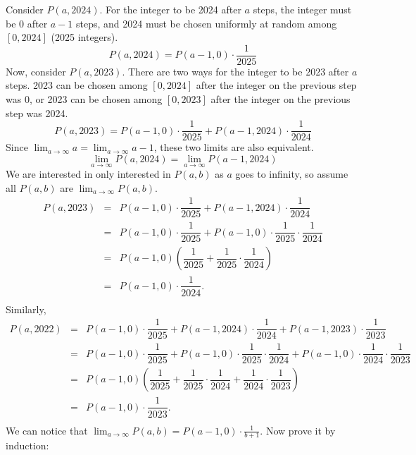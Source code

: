 \documentclass[12pt, oneside]{article}
\begin{document}
Consider $P(a, 2024)$. For the integer to be 2024 after $a$ steps, the integer must be 0 after $a-1$ steps, and 2024 must be chosen uniformly at random among $[0, 2024]$ (2025 integers).
\[P(a, 2024) = P(a-1, 0) \cdot \frac{1}{2025}\]
Now, consider $P(a, 2023)$. There are two ways for the integer to be 2023 after $a$ steps. 2023 can be chosen among $[0, 2024]$ after the integer on the previous step was 0, or 2023 can be chosen among $[0, 2023]$ after the integer on the previous step was 2024.
\[P(a, 2023) = P(a-1, 0) \cdot \frac{1}{2025} + P(a-1, 2024) \cdot \frac{1}{2024}\]
Since $\displaystyle \lim_{a \rightarrow \infty} a = \lim_{a \rightarrow \infty} a-1$, these two limits are also equivalent. \[ \lim_{a \rightarrow \infty} P(a, 2024) = \lim_{a \rightarrow \infty} P(a-1, 2024)\]
We are interested in only interested in $P(a, b)$ as $a$ goes to infinity, so assume all $P(a, b)$ are $\lim_{a \rightarrow \infty} P(a, b)$.
\begin{eqnarray*}
P(a, 2023) &=& P(a-1, 0) \cdot \dfrac{1}{2025} + P(a-1, 2024) \cdot \dfrac{1}{2024}\\
 &=& P(a-1, 0) \cdot \dfrac{1}{2025} + P(a-1, 0) \cdot \dfrac{1}{2025} \cdot \dfrac{1}{2024}\\
 &=& P(a-1, 0) (\dfrac{1}{2025} + \dfrac{1}{2025} \cdot \dfrac{1}{2024})\\
 &=& P(a-1, 0) \cdot \dfrac{1}{2024}.\\
 \end{eqnarray*}
 Similarly, 
\begin{eqnarray*}
P(a, 2022) &=& P(a-1, 0) \cdot \dfrac{1}{2025} + P(a-1, 2024) \cdot \dfrac{1}{2024} + P(a-1, 2023) \cdot \dfrac{1}{2023}\\
 &=& P(a-1, 0) \cdot \dfrac{1}{2025} + P(a-1, 0) \cdot \dfrac{1}{2025} \cdot \dfrac{1}{2024} + P(a-1, 0) \cdot \dfrac{1}{2024} \cdot \dfrac{1}{2023}\\
 &=& P(a-1, 0) (\dfrac{1}{2025} + \dfrac{1}{2025} \cdot \dfrac{1}{2024} + \dfrac{1}{2024} \cdot \dfrac{1}{2023})\\
 &=& P(a-1, 0) \cdot \dfrac{1}{2023}.\\
\end{eqnarray*}
We can notice that $\displaystyle \lim_{a \rightarrow \infty} P(a, b) = P(a-1, 0) \cdot \frac{1}{b+1}$. Now prove it by induction:
\end{document}
